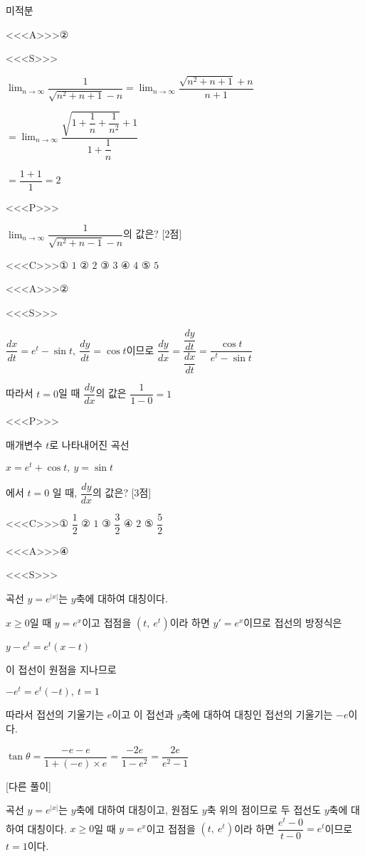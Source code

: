 \documentclass{oblivoir}
\begin{document}
미적분

<<<A>>>②

<<<S>>>

$\displaystyle\lim_{n\to \infty}\dfrac{1}{\sqrt{n^{2}+n+1}-n}$$=\displaystyle\lim_{n\to \infty}\dfrac{\sqrt{n^{2}+n+1}+n}{n+1}$

$=\displaystyle\lim_{n\to \infty}\dfrac{\sqrt{1 +\dfrac{1}{n}+\dfrac{1}{n^{2}}}+1}{1+\dfrac{1}{n}}$

$=\dfrac{1+1}{1}=2$

<<<P>>>

$\displaystyle\lim_{n\to \infty}$$\dfrac{1}{\sqrt{n^{2}+n-1}-n}$의 값은? [2점]

<<<C>>>① $1$ ② $2$ ③ $3$ ④ $4$ ⑤ $5$

<<<A>>>②

<<<S>>>

$\dfrac{dx}{dt}= e^{t}-\sin t ,\:\dfrac{dy}{dt}=\cos t$이므로 $\dfrac{dy}{dx}=\dfrac{\dfrac{dy}{dt}}{\dfrac{dx}{dt}}=\dfrac{\cos t}{e^{t}-\sin t}$

따라서 $t=0$일 때 $\dfrac{dy}{dx}$의 값은 $\dfrac{1}{1-0}=1$

<<<P>>>

매개변수 $t$로 나타내어진 곡선 

$x= e^{t}+\cos t,\:y=\sin t$

에서 $t=0$ 일 때, $\dfrac{dy}{dx}$의 값은? [3점]

<<<C>>>① $\dfrac{1}{2}$ ② $1$ ③ $\dfrac{3}{2}$ ④ $2$ ⑤ $\dfrac{5}{2}$

<<<A>>>④

<<<S>>>

곡선 $y=e^{| x |}$는 $y$축에 대하여 대칭이다. 

$x\ge 0$일 때 $y=e^{x}$이고 접점을 $(t,\: e^{t})$이라 하면 $y'=e^{x}$이므로 접선의 방정식은

$y-e^{t}=e^{t}(x-t)$

이 접선이 원점을 지나므로

$-e^{t}=e^{t}(-t),\: t=1$

따라서 접선의 기울기는 $e$이고 이 접선과 $y$축에 대하여 대칭인 접선의 기울기는 $-e$이다.

$\tan\theta =\dfrac{-e-e}{1+(-e)\times e}=\dfrac{-2e}{1-e^{2}}=\dfrac{2e}{e^{2}-1}$

[다른 풀이]

곡선 $y=e^{| x |}$는 $y$축에 대하여 대칭이고, 원점도 $y$축 위의 점이므로 두 접선도 $y$축에 대하여 대칭이다. $x\ge 0$일 때 $y=e^{x}$이고 접점을 $(t,\: e^{t})$이라 하면 $\dfrac{e^{t}-0}{t-0}=e^{t}$이므로 $t=1$이다.
\end{document}
